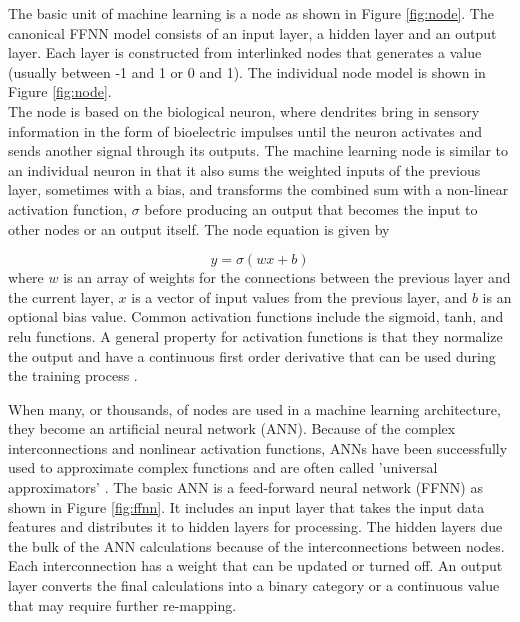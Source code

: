 \documentclass[twoside,twocolumn]{article}
\begin{document}
The basic unit of machine learning is a node as shown in  Figure \ref{fig:node}. The canonical FFNN model consists of an input layer, a hidden layer and an output layer. Each layer is constructed from interlinked nodes that generates a value (usually between -1 and 1 or 0 and 1). The individual node model is shown in Figure \ref{fig:node}. \\

The node is based on the biological neuron, where dendrites bring in sensory information in the form of bioelectric impulses until the neuron activates and sends another signal through its outputs. The machine learning node is similar to an individual neuron in that it also sums the weighted inputs of the previous layer, sometimes with a bias, and transforms the combined sum with a non-linear activation function, $\sigma$ before producing an output that becomes the input to other nodes or an output itself. The node  equation is given by

\begin{equation}
\label{eq:perceptron}
y= \sigma(wx+b)
\end{equation}
\noindent
where $w$ is an array of weights for the connections between the previous layer and the current layer, $x$ is a vector of input values from the previous layer, and $b$ is an optional bias value. Common activation functions include the sigmoid, tanh, and relu functions. A general property for activation functions is that they normalize the output and have a continuous first order derivative that can be used during the training process \citep{Goodfellow2016}. 

When many, or thousands, of nodes are used in a machine learning architecture, they become an artificial neural network (ANN). Because of the complex interconnections and nonlinear activation functions, ANNs have been successfully used to approximate complex functions and are often called 'universal approximators' \citep{Sifaoui2008, Sonoda2017}. The basic ANN is a feed-forward neural network (FFNN) as shown in Figure \ref{fig:ffnn}. It includes an input layer that takes the input data features and distributes it to hidden layers for processing. The hidden layers due the bulk of the ANN calculations because of the interconnections between nodes. Each interconnection has a weight that can be updated or turned off. An output layer converts the final calculations into a binary category or a continuous value that may require further re-mapping.
\end{document}
